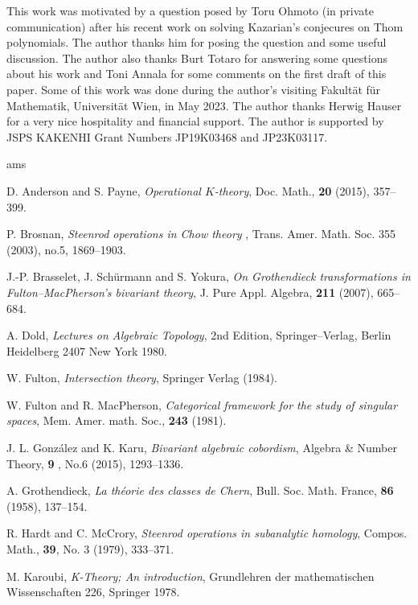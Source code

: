 \documentclass[a4paper]{amsart}
\begin{document}
This work was motivated by a question posed by Toru Ohmoto  (in private communication) after his recent work \cite{Ohmoto} on solving Kazarian's conjecures \cite{Kaz} on Thom polynomials. The author thanks him for posing the question and some useful discussion. The author also thanks Burt Totaro for answering some questions about his work \cite{Totaro} and Toni Annala for some comments on the first draft of this paper.
Some of this work was done during the author's visiting Fakult\"at f\"ur Mathematik, Universit\"at Wien, in May 2023. The author thanks Herwig Hauser for a very nice hospitality and financial support. 
The author is supported by JSPS KAKENHI Grant Numbers JP19K03468 and JP23K03117.\\



\begin{thebibliography}{ams}

 D. Anderson and S. Payne, {\it Operational $K$-theory},  Doc. Math., {\bf 20} (2015), 357--399.


 P. Brosnan, {\it Steenrod operations in Chow theory}
, Trans. Amer. Math. Soc. 355 (2003), no.5, 1869--1903.

  J.-P. Brasselet, J. Sch\"urmann and S. Yokura, {\it On Grothendieck transformations in Fulton--MacPherson's bivariant theory}, J. Pure Appl. Algebra, {\bf 211} (2007), 665--684.

 A. Dold, {\it Lectures on Algebraic Topology}, 2nd Edition, Springer--Verlag, Berlin Heidelberg 2407 New York 1980.

W. Fulton, {\it Intersection theory}, Springer Verlag (1984).
  
W. Fulton and R. MacPherson, {\it Categorical framework for the study of  
  singular spaces},  Mem. Amer. math. Soc., {\bf 243} (1981).
  
J. L. Gonz\'alez and K. Karu, {\it Bivariant algebraic cobordism}, Algebra \& Number Theory, {\bf 9} , No.6 (2015), 1293--1336.

 A. Grothendieck, {\it La  th\'eorie des classes de Chern}, Bull. Soc. Math. France, {\bf 86} (1958), 137--154.

 R. Hardt and C. McCrory, {\it Steenrod operations in subanalytic homology}, Compos. Math., {\bf 39}, No. 3 (1979), 333--371.

 M. Karoubi, {\it K-Theory; An introduction}, Grundlehren der mathematischen Wissenschaften 226, Springer 1978. 
 

\end{thebibliography}
\end{document}
